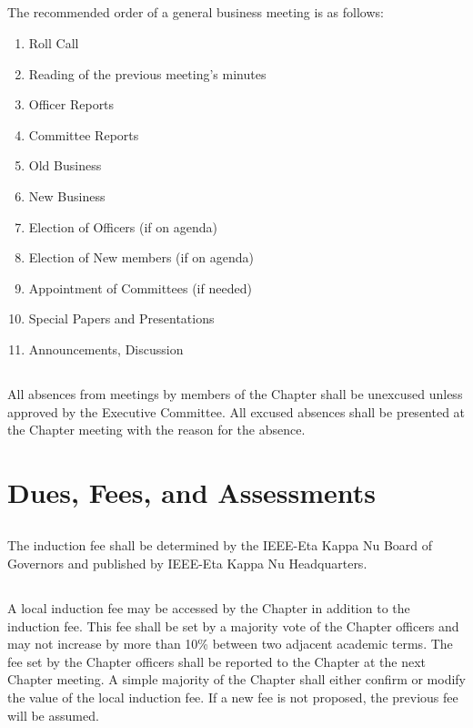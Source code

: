 \documentclass[10pt, oneside]{article}
\begin{document}
\subsection{}
The recommended order of a general business meeting is as follows:
\begin{enumerate}[label=\alph*.]
\item Roll Call
\item Reading of the previous meeting’s minutes
\item Officer Reports
\item Committee Reports
\item Old Business
\item New Business
\item Election of Officers (if on agenda)
\item Election of New members (if on agenda)
\item Appointment of Committees (if needed)
\item Special Papers and Presentations
\item Announcements, Discussion
\end{enumerate}

\subsection{}
All absences from meetings by members of the Chapter shall be unexcused unless approved by the Executive Committee. All excused absences shall be presented at the Chapter meeting with the reason for the absence.

\section{Dues, Fees, and Assessments}
\subsection{}
The induction fee shall be determined by the IEEE-Eta Kappa Nu Board of Governors and published by IEEE-Eta Kappa Nu Headquarters.

\subsection{}
A local induction fee may be accessed by the Chapter in addition to the induction fee. This fee shall be set by a majority vote of the Chapter officers and may not increase by more than 10\% between two adjacent academic terms. The fee set by the Chapter officers shall be reported to the Chapter at the next Chapter meeting. A simple majority of the Chapter shall either confirm or modify the value of the local induction fee. If a new fee is not proposed, the previous fee will be assumed.
\end{document}
